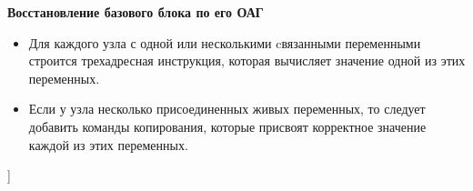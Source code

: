\textbf{Восстановление базового блока по его ОАГ}
\begin{itemize}
    \item Для каждого узла с одной или несколькими cвязанными переменными строится трехадресная инструкция, которая вычисляет значение одной из этих переменных.
    \item Если у узла несколько присоединенных живых переменных, то следует добавить команды копирования, которые присвоят корректное значение каждой из этих переменных.
\end{itemize}

\bigbreak
[\cite[slides 29-45]{ssg}]